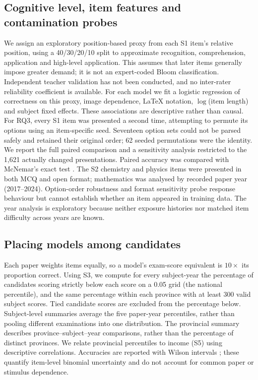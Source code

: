 \documentclass[preprint,12pt,authoryear,nonatbib]{elsarticle}
\begin{document}
\subsection{Cognitive level, item features and contamination probes}
We assign an exploratory position-based proxy from each S1 item's relative position, using a 40/30/20/10 split to approximate recognition, comprehension, application and high-level application. This assumes that later items generally impose greater demand; it is not an expert-coded Bloom classification. Independent teacher validation has not been conducted, and no inter-rater reliability coefficient is available. For each model we fit a logistic regression of correctness on this proxy, image dependence, LaTeX notation, $\log$(item length) and subject fixed effects. These associations are descriptive rather than causal. For RQ3, every S1 item was presented a second time, attempting to permute its options using an item-specific seed. Seventeen option sets could not be parsed safely and retained their original order; 62 seeded permutations were the identity. We report the full paired comparison and a sensitivity analysis restricted to the 1,621 actually changed presentations. Paired accuracy was compared with McNemar's exact test \citep{mcnemar1947}. The S2 chemistry and physics items were presented in both MCQ and open format; mathematics was analysed by recorded paper year (2017--2024). Option-order robustness and format sensitivity probe response behaviour but cannot establish whether an item appeared in training data. The year analysis is exploratory because neither exposure histories nor matched item difficulty across years are known.

\subsection{Placing models among candidates}
Each paper weights items equally, so a model's exam-score equivalent is $10\times$ its proportion correct. Using S3, we compute for every subject-year the percentage of candidates scoring strictly below each score on a 0.05 grid (the national percentile), and the same percentage within each province with at least 300 valid subject scores. Tied candidate scores are excluded from the percentage below. Subject-level summaries average the five paper-year percentiles, rather than pooling different examinations into one distribution. The provincial summary describes province--subject--year comparisons, rather than the percentage of distinct provinces. We relate provincial percentiles to income (S5) using descriptive correlations. Accuracies are reported with Wilson intervals \citep{wilson1927}; these quantify item-level binomial uncertainty and do not account for common paper or stimulus dependence.
\end{document}
